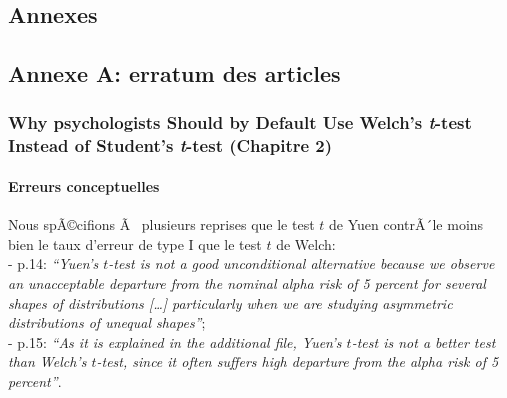 \clearpage



\begin{appendix}
\hypertarget{annexes}{%
\section{Annexes}\label{annexes}}

\hypertarget{annexe-a-erratum-des-articles}{%
\subsection{Annexe A: erratum des
articles}\label{annexe-a-erratum-des-articles}}

\hypertarget{why-psychologists-should-by-default-use-welchs-t-test-instead-of-students-t-test-chapitre-2}{%
\subsubsection{\texorpdfstring{Why psychologists Should by Default Use
Welch's \emph{t}-test Instead of Student's \emph{t}-test (Chapitre
2)}{Why psychologists Should by Default Use Welch's t-test Instead of Student's t-test (Chapitre 2)}}\label{why-psychologists-should-by-default-use-welchs-t-test-instead-of-students-t-test-chapitre-2}}

\hypertarget{erreurs-conceptuelles}{%
\paragraph{Erreurs conceptuelles}\label{erreurs-conceptuelles}}

Nous spÃ©cifions Ã~ plusieurs reprises que le test \(t\) de Yuen
contrÃ´le moins bien le taux d'erreur de type I que le test \(t\) de
Welch:\\
- p.14: \emph{``Yuen's \(t\)-test is not a good unconditional
alternative because we observe an unacceptable departure from the
nominal alpha risk of 5 percent for several shapes of distributions
{[}\ldots{]} particularly when we are studying asymmetric distributions
of unequal shapes''};\\
- p.15: \emph{``As it is explained in the additional file, Yuen's
\(t\)-test is not a better test than Welch's \(t\)-test, since it often
suffers high departure from the alpha risk of 5 percent''}.


\end{appendix}
